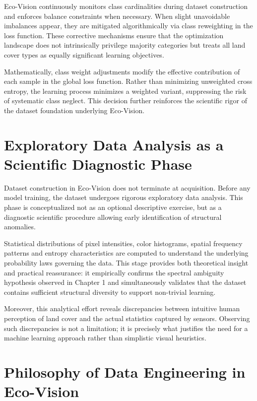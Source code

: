 \documentclass[12pt,a4paper]{report}
\begin{document}
Eco-Vision continuously monitors class cardinalities during dataset construction and enforces balance constraints when necessary. When slight unavoidable imbalances appear, they are mitigated algorithmically via class reweighting in the loss function. These corrective mechanisms ensure that the optimization landscape does not intrinsically privilege majority categories but treats all land cover types as equally significant learning objectives.

Mathematically, class weight adjustments modify the effective contribution of each sample in the global loss function. Rather than minimizing unweighted cross entropy, the learning process minimizes a weighted variant, suppressing the risk of systematic class neglect. This decision further reinforces the scientific rigor of the dataset foundation underlying Eco-Vision.

\section{Exploratory Data Analysis as a Scientific Diagnostic Phase}

Dataset construction in Eco-Vision does not terminate at acquisition. Before any model training, the dataset undergoes rigorous exploratory data analysis. This phase is conceptualized not as an optional descriptive exercise, but as a diagnostic scientific procedure allowing early identification of structural anomalies.

Statistical distributions of pixel intensities, color histograms, spatial frequency patterns and entropy characteristics are computed to understand the underlying probability laws governing the data. This stage provides both theoretical insight and practical reassurance: it empirically confirms the spectral ambiguity hypothesis observed in Chapter 1 and simultaneously validates that the dataset contains sufficient structural diversity to support non-trivial learning.

Moreover, this analytical effort reveals discrepancies between intuitive human perception of land cover and the actual statistics captured by sensors. Observing such discrepancies is not a limitation; it is precisely what justifies the need for a machine learning approach rather than simplistic visual heuristics.

\section{Philosophy of Data Engineering in Eco-Vision}
\end{document}
